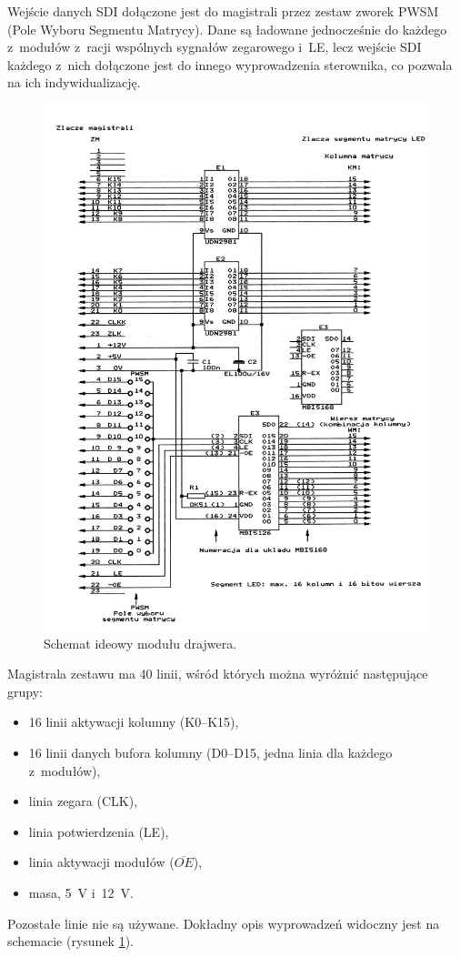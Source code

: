 Wejście danych SDI dołączone jest do magistrali przez zestaw zworek PWSM (Pole Wyboru Segmentu Matrycy). Dane są ładowane jednocześnie do każdego z~modułów z~racji wspólnych sygnałów zegarowego i~LE, lecz wejście SDI każdego z~nich dołączone jest do innego wyprowadzenia sterownika, co pozwala na ich indywidualizację. 

\begin{figure}[!p]
    \begin{center}
       \includegraphics[width=1.1\textwidth]{figures/schemat-driver.png}
    \end{center}

    \caption{Schemat ideowy modułu drajwera.}
    \label{schemat-drivera}
\end{figure}

Magistrala zestawu ma 40 linii, wśród których można wyróżnić następujące grupy:
\begin{itemize}
	\item 16 linii aktywacji kolumny (K0--K15),
	\item 16 linii danych bufora kolumny (D0--D15, jedna linia dla każdego z~modułów),
	\item linia zegara (CLK),
	\item linia potwierdzenia (LE),
	\item linia aktywacji modułów ($\overline{OE}$),
	\item masa, 5~V i~12~V.
\end{itemize}
Pozostałe linie nie są używane. Dokładny opis wyprowadzeń widoczny jest na schemacie (rysunek \ref{schemat-drivera}). 

